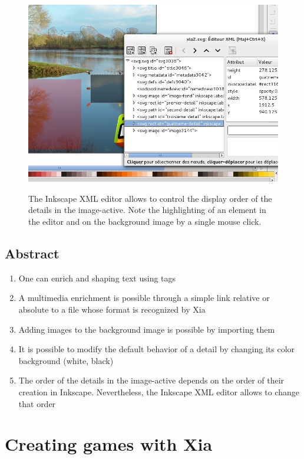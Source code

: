 \begin{figure}[htp]
 \centering
 \caption{The Inkscape XML editor allows to control the display order of the details in the image-active. Note the highlighting of an element  
in the editor and on the background image by a single mouse click.}
 \includegraphics[width=\textwidth]{images/ordre_couches}
 \label{ordre_couches}
\end{figure}

\subsection{Abstract}

\begin{enumerate}
 \item One can enrich and shaping text using tags
 \item A multimedia enrichment is possible through a simple link relative
or absolute to a file whose format is recognized by Xia
 \item Adding images to the background image is possible by importing them
 \item It is possible to modify the default behavior of a detail by changing its color 
background (white, black)
 \item The order of the details in the image-active depends on the order
of their creation in Inkscape. Nevertheless, the Inkscape XML editor allows to change that order
\end{enumerate}


\section{Creating games with Xia}

